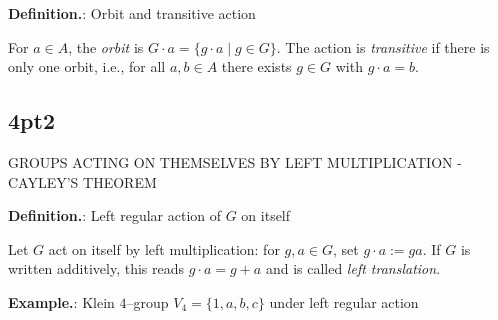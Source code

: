 \documentclass[12pt]{article}
\theoremstyle{definition}
\begin{document}
\newpage


\noindent\textbf{Definition.}: Orbit and transitive action

\newpage

For $a\in A$, the \emph{orbit} is $G\cdot a=\{g\cdot a\mid g\in G\}$. The action is \emph{transitive} if there is only one orbit, i.e., for all $a,b\in A$ there exists $g\in G$ with $g\cdot a=b$.\\


\newpage

\subsection*{4pt2}

\newpage

GROUPS ACTING ON THEMSELVES BY LEFT MULTIPLICATION - CAYLEY'S THEOREM 

\newpage


\noindent\textbf{Definition.}: Left regular action of $G$ on itself

\newpage

Let $G$ act on itself by left multiplication: for $g,a\in G$, set $g\cdot a:=ga$. If $G$ is written additively, this reads $g\cdot a=g+a$ and is called \emph{left translation}.\\


\newpage


\noindent\textbf{Example.}: Klein $4$–group $V_4=\{1,a,b,c\}$ under left regular action
\end{document}
